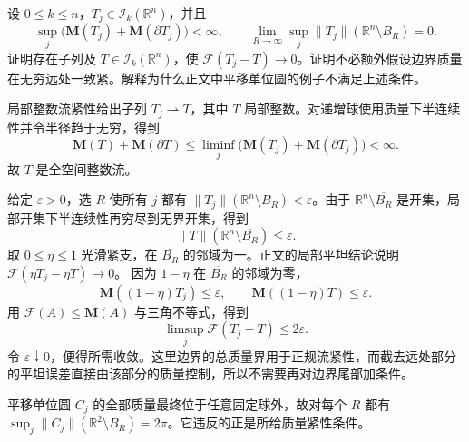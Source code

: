 \begin{exercise}\label{g3:ex:current-tightness-global-flat}
	设 \(0\le k\le n\)，\(T_j\in\mathcal I_k(\mathbb R^n)\)，并且
	\[
		\sup_j\bigl(\mathbf M(T_j)+\mathbf M(\partial T_j)\bigr)<\infty,
		\qquad
		\lim_{R\to\infty}\sup_j
		\|T_j\|(\mathbb R^n\setminus B_R)=0.
	\]
	证明存在子列及 \(T\in\mathcal I_k(\mathbb R^n)\)，使
	\(\mathcal F(T_j-T)\to0\)。证明不必额外假设边界质量在无穷远处一致紧。解释为什么正文中平移单位圆的例子不满足上述条件。
\end{exercise}
\begin{solution}
	局部整数流紧性给出子列 \(T_j\rightharpoonup T\)，其中 \(T\) 局部整数。对递增球使用质量下半连续性并令半径趋于无穷，得到
	\[
		\mathbf M(T)+\mathbf M(\partial T)
		\le\liminf_j
		\bigl(\mathbf M(T_j)+\mathbf M(\partial T_j)\bigr)<\infty.
	\]
	故 \(T\) 是全空间整数流。

	给定 \(\varepsilon>0\)，选 \(R\) 使所有 \(j\) 都有
	\(\|T_j\|(\mathbb R^n\setminus B_R)<\varepsilon\)。由于
	\(\mathbb R^n\setminus\overline{B_R}\) 是开集，局部开集下半连续性再穷尽到无界开集，得到
	\[
		\|T\|(\mathbb R^n\setminus\overline{B_R})\le\varepsilon.
	\]
	取 \(0\le\eta\le1\) 光滑紧支，在 \(\overline{B_R}\) 的邻域为一。正文的局部平坦结论说明
	\(\mathcal F(\eta T_j-\eta T)\to0\)。
	因为 \(1-\eta\) 在 \(\overline{B_R}\) 的邻域为零，
	\[
		\mathbf M((1-\eta)T_j)\le\varepsilon,\qquad
		\mathbf M((1-\eta)T)\le\varepsilon.
	\]
	用 \(\mathcal F(A)\le\mathbf M(A)\) 与三角不等式，得到
	\[
		\limsup_j\mathcal F(T_j-T)
		\le 2\varepsilon.
	\]
	令 \(\varepsilon\downarrow0\)，便得所需收敛。这里边界的总质量界用于正规流紧性，而截去远处部分的平坦误差直接由该部分的质量控制，所以不需要再对边界尾部加条件。

	平移单位圆 \(C_j\) 的全部质量最终位于任意固定球外，故对每个 \(R\) 都有
	\(\sup_j\|C_j\|(\mathbb R^2\setminus B_R)=2\pi\)。它违反的正是所给质量紧性条件。
\end{solution}
